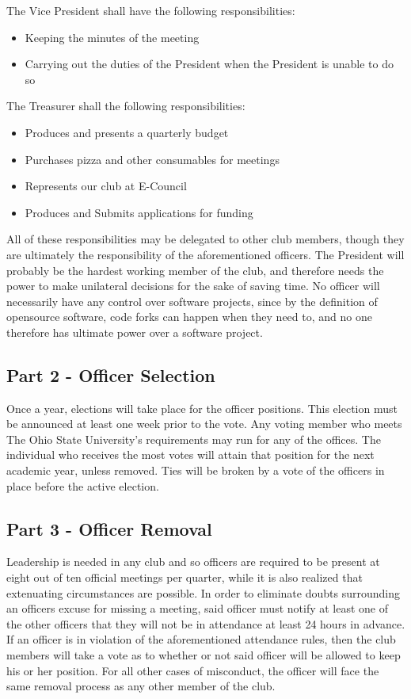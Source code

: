 \documentclass{article}
\begin{document}
	The Vice President shall have the following responsibilities:
	\begin{itemize}
		\item Keeping the minutes of the meeting
		\item Carrying out the duties of the President when the President is unable to do so
	\end{itemize}

	The Treasurer shall the following responsibilities:

	\begin{itemize}
		\item Produces and presents a quarterly budget
		\item Purchases pizza and other consumables for meetings
		\item Represents our club at E-Council
		\item Produces and Submits applications for funding
	\end{itemize}

	All of these responsibilities may be delegated to other club members, though they are ultimately the responsibility of the aforementioned officers.  The President will probably be the hardest working member of the club, and therefore needs the power to make unilateral decisions for the sake of saving time.  No officer will necessarily have any control over software projects, since by the definition of opensource software, code forks can happen when they need to, and no one therefore has ultimate power over a software project.

	\subsection{Part 2 - Officer Selection}

	Once a year, elections will take place for the officer positions.  This election must be announced at least one week prior to the vote.  Any voting member who meets The Ohio State University's requirements may run for any of the offices.  The individual who receives the most votes will attain that position for the next academic year, unless removed.  Ties will be broken by a vote of the officers in place before the active election.

	\subsection{Part 3 - Officer Removal}

	Leadership is needed in any club and so officers are required to be
present at eight out of ten official meetings per quarter, while it is also
realized that extenuating circumstances are possible.  In order to eliminate
doubts surrounding an officers excuse for missing a meeting, said officer
must notify at least one of the other officers that they will not be in
attendance at least 24 hours in advance.  If an officer is in violation of
the aforementioned attendance rules, then the club members will take a vote
as to whether or not said officer will be allowed to keep his or her
position. For all other cases of misconduct, the officer will face the same
removal process as any other member of the club.
\end{document}
